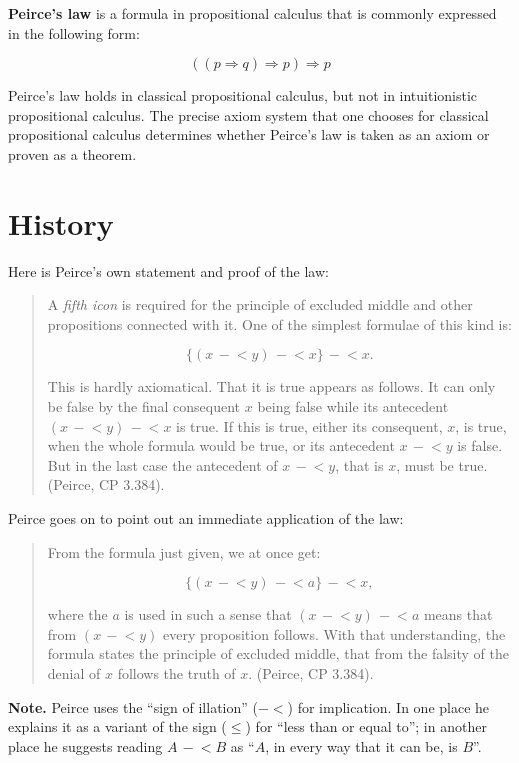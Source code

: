 \documentclass[12pt]{article}
\begin{document}
\textbf{Peirce's law} is a formula in propositional calculus that is commonly expressed in the following form:

\[ ((p \Rightarrow q) \Rightarrow p) \Rightarrow p \]

Peirce's law holds in classical propositional calculus, but not in intuitionistic propositional calculus.  The precise axiom system that one chooses for classical propositional calculus determines whether Peirce's law is taken as an axiom or proven as a theorem.

\tableofcontents

\section{History}

Here is Peirce's own statement and proof of the law:

\begin{quote}
A \textit{fifth icon} is required for the principle of excluded middle and other propositions connected with it.  One of the simplest formulae of this kind is:

\[ \{ (x \,-\!\!\!< y) \,-\!\!\!< x \} \,-\!\!\!< x. \]

This is hardly axiomatical.  That it is true appears as follows.  It can only be false by the final consequent $x$ being false while its antecedent $(x \,-\!\!\!< y) \,-\!\!\!< x$ is true.  If this is true, either its consequent, $x$, is true, when the whole formula would be true, or its antecedent $x \,-\!\!\!< y$ is false.  But in the last case the antecedent of $x \,-\!\!\!< y$, that is $x$, must be true.  (Peirce, CP 3.384).
\end{quote}

Peirce goes on to point out an immediate application of the law:

\begin{quote}
From the formula just given, we at once get:

\[ \{ (x \,-\!\!\!< y) \,-\!\!\!< a \} \,-\!\!\!< x, \]

where the $a$ is used in such a sense that $(x \,-\!\!\!< y) \,-\!\!\!< a$ means that from $(x \,-\!\!\!< y)$ every proposition follows.  With that understanding, the formula states the principle of excluded middle, that from the falsity of the denial of $x$ follows the truth of $x$.  (Peirce, CP 3.384).
\end{quote}

\textbf{Note.}  Peirce uses the ``sign of illation'' ($-\!\!\!<$) for implication.  In one place he explains it as a variant of the sign ($\le$) for ``less than or equal to''; in another place he suggests reading $A \,-\!\!\!< B$ as ``$A$, in every way that it can be, is $B$''.
\end{document}
